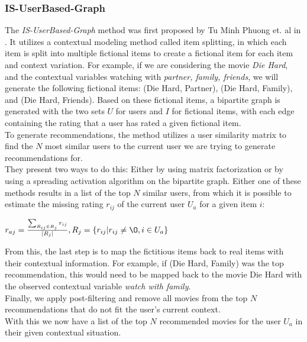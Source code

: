 \subsubsection{IS-UserBased-Graph}
The \textit{IS-UserBased-Graph} method was first proposed by Tu Minh Phuong et. al in \cite{GraphBasedCollaborativePaper}.
It utilizes a contextual modeling method called item splitting, in which each item is split into multiple fictional items to create a fictional item for each item and context variation.
For example, if we are considering the movie \textit{Die Hard}, and the contextual variables watching with \textit{partner, family, friends}, we will generate the following fictional items: (Die Hard, Partner), (Die Hard, Family), and (Die Hard, Friends).
Based on these fictional items, a bipartite graph is generated with the two sets $U$ for users and $I$ for fictional items, with each edge containing the rating that a user has rated a given fictional item.\\
To generate recommendations, the method utilizes a user similarity matrix to find the $N$ most similar users to the current user we are trying to generate recommendations for.\\
They present two ways to do this: Either by using matrix factorization or by using a spreading activation algorithm on the bipartite graph.
Either one of these methods results in a list of the top $N$ similar users, from which it is possible to estimate the missing rating $r_{ij}$ of the current user $U_a$ for a given item $i$:

$r_{aj} = \frac{\sum_{R_{ij} \in R_j} r_{ij}}{|R_j|}, R_j = \{ r_{ij} | r_{ij} \neq \O , i \in U_a \}$

From this, the last step is to map the fictitious items back to real items with their contextual information.
For example, if (Die Hard, Family) was the top recommendation, this would need to be mapped back to the movie Die Hard with the observed contextual variable \textit{watch with family}.\\
Finally, we apply post-filtering and remove all movies from the top $N$ recommendations that do not fit the user's current context.\\
With this we now have a list of the top $N$ recommended movies for the user $U_a$ in their given contextual situation.
